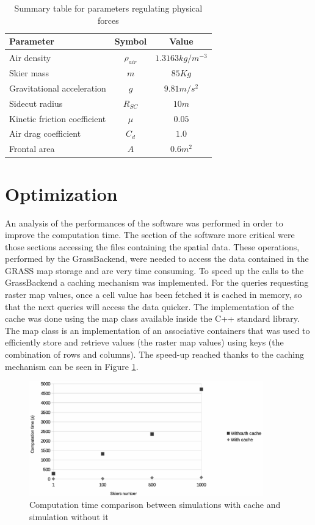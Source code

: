 \documentclass[12pt,a4paper,twoside]{book}
\begin{document}
\begin{table}
  \centering
  \begin{tabular}{ l | c | c }
    \hline
    Parameter & Symbol & Value \\
    \hline
    Air density & $\rho_{air}$ & $1.3163 kg/m^{-3}$ \\
    Skier mass & $m$ & $85 Kg$ \\
    Gravitational acceleration & $g$ & $9.81 m/s^2$ \\
    Sidecut radius & $R_{SC}$ & $10m$ \\
    Kinetic friction coefficient & $\mu$ & $0.05$ \\
    Air drag coefficient & $C_d$ & $1.0$ \\
    Frontal area & $A$ & $0.6 m^2$ \\
    \hline
  \end{tabular}
  \caption{Summary table for parameters regulating physical forces}
  \label{physical_parameters_table}
\end{table}

\section{Optimization}
An analysis of the performances of the software was performed in order to improve the computation time. The section of the software more critical were those sections accessing the files containing the spatial data. These operations, performed by the GrassBackend, were needed to access the data contained in the GRASS map storage and are very time consuming. To speed up the calls to the GrassBackend a caching mechanism was implemented. For the queries requesting raster map values, once a cell value has been fetched it is cached in memory, so that the next queries will access the data quicker. The implementation of the cache was done using the map class available inside the C++ standard library. The map class is an implementation of an associative containers that was used to efficiently store and retrieve values (the raster map values) using keys (the combination of rows and columns). The speed-up reached thanks to the caching mechanism can be seen in Figure \ref{speed-up_cache}.

\begin{figure}[!h]
  \begin{center}
    \includegraphics[width=0.9\textwidth]{images/caching.eps}
    \caption{Computation time comparison between simulations with cache and simulation without it}\label{speed-up_cache}
  \end{center}
\end{figure}
\end{document}
